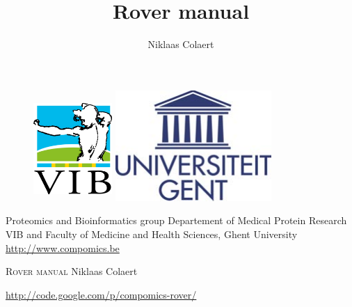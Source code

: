 \documentclass[11pt,a4paper,oneside,notitlepage]{book}
\begin{document}
\frontmatter

\title{Rover manual}
\author{Niklaas Colaert}



\begin{titlepage}

\fontsize{12pt}{14pt}\selectfont

\begin{center}

\begin{figure}[H] 
		\begin{center}
			\includegraphics[width=3cm, height=4cm]{VIB.pdf}
			\hfill 
			\includegraphics{ugent.pdf}
			
		\end{center}
\end{figure}



\vspace{0.3cm}


\vspace{0.8cm}
Proteomics and Bioinformatics group 
\linebreak  Departement of Medical Protein Research
\linebreak  VIB and Faculty of Medicine and Health Sciences, Ghent University
\linebreak  \url{http://www.compomics.be}


\vspace{3.2cm}

	\begin{minipage}[c][4.5cm][c]{15cm}
	\begin{center}
	\fontsize{17.28pt}{21pt}\selectfont
	{\textsc{Rover manual}}
	\vspace{0.2cm}
	\fontsize{12pt}{14pt}\selectfont
	\linebreak  Niklaas Colaert
	\end{center}
	\end{minipage}
	
	
\vspace{4.5cm}

\date{}
 \url{http://code.google.com/p/compomics-rover/}
\end{center}
\end{titlepage}
\end{document}
